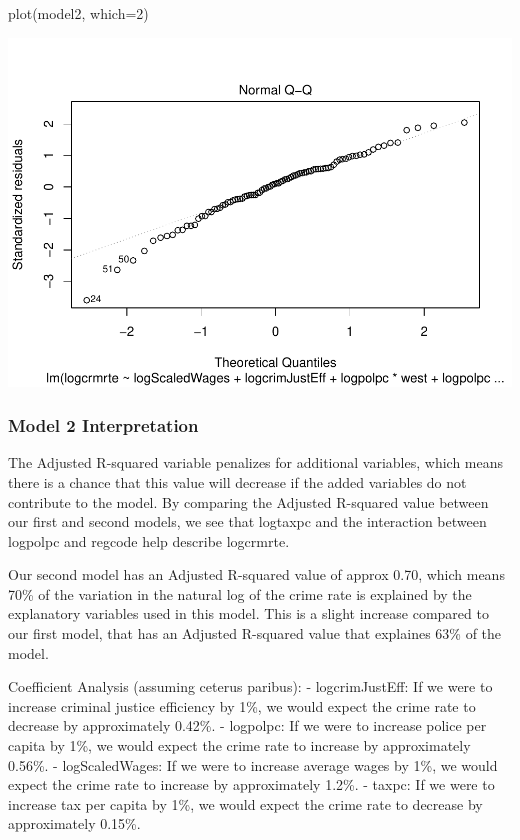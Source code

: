 \documentclass[]{article}
\newenvironment{Shaded}{}{}
\newcommand{\DataTypeTok}[1]{#1}
\newcommand{\DecValTok}[1]{#1}
\newcommand{\KeywordTok}[1]{\textcolor[rgb]{0.00,0.00,1.00}{#1}}
\newcommand{\NormalTok}[1]{#1}
\begin{document}
\begin{Shaded}
\begin{Highlighting}[]
\KeywordTok{plot}\NormalTok{(model2, }\DataTypeTok{which=}\DecValTok{2}\NormalTok{)}
\end{Highlighting}
\end{Shaded}

\includegraphics{Bagnard_Gaustad_Hartman_Leung_Lab_3_files/figure-latex/unnamed-chunk-76-1.pdf}

\hypertarget{model-2-interpretation}{%
\subsubsection{Model 2 Interpretation}\label{model-2-interpretation}}

The Adjusted R-squared variable penalizes for additional variables,
which means there is a chance that this value will decrease if the added
variables do not contribute to the model. By comparing the Adjusted
R-squared value between our first and second models, we see that
logtaxpc and the interaction between logpolpc and regcode help describe
logcrmrte.

Our second model has an Adjusted R-squared value of approx 0.70, which
means 70\% of the variation in the natural log of the crime rate is
explained by the explanatory variables used in this model. This is a
slight increase compared to our first model, that has an Adjusted
R-squared value that explaines 63\% of the model.

Coefficient Analysis (assuming ceterus paribus): - logcrimJustEff: If we
were to increase criminal justice efficiency by 1\%, we would expect the
crime rate to decrease by approximately 0.42\%. - logpolpc: If we were
to increase police per capita by 1\%, we would expect the crime rate to
increase by approximately 0.56\%. - logScaledWages: If we were to
increase average wages by 1\%, we would expect the crime rate to
increase by approximately 1.2\%. - taxpc: If we were to increase tax per
capita by 1\%, we would expect the crime rate to decrease by
approximately 0.15\%.
\end{document}
